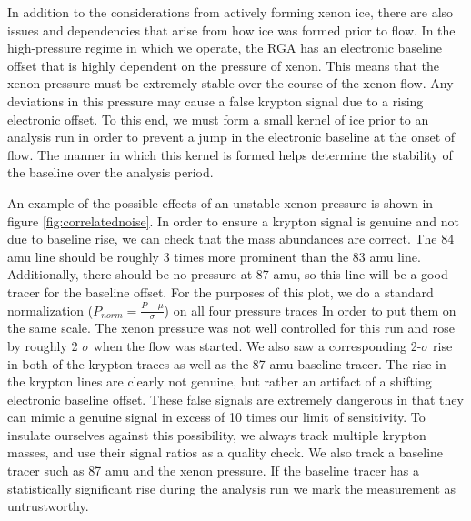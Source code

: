 In addition to the considerations from actively forming xenon ice, there are also issues and dependencies that arise from how ice was formed prior to flow. In the high-pressure regime in which we operate, the RGA has an electronic baseline offset that is highly dependent on the pressure of xenon. This means that the xenon pressure must be extremely stable over the course of the xenon flow. Any deviations in this pressure may cause a false krypton signal due to a rising electronic offset. To this end, we must form a small kernel of ice prior to an analysis run in order to prevent a jump in the electronic baseline at the onset of flow. The manner in which this kernel is formed helps determine the stability of the baseline over the analysis period.

An example of the possible effects of an unstable xenon pressure is shown in figure \ref{fig:correlatednoise}. In order to ensure a krypton signal is genuine and not due to baseline rise, we can check that the mass abundances are correct. The 84 amu line should be roughly 3 times more prominent than the 83 amu line. Additionally, there should be no pressure at 87 amu, so this line will be a good tracer for the baseline offset. For the purposes of this plot, we do a standard normalization ($P_{norm}=\frac{P-\mu}{\sigma}$) on all four pressure traces In order to put them on the same scale. The xenon pressure was not well controlled for this run and rose by roughly 2 $\sigma$ when the flow was started. We also saw a corresponding 2-$\sigma$ rise in both of the krypton traces as well as the 87 amu baseline-tracer. The rise in the krypton lines are clearly not genuine, but rather an artifact of a shifting electronic baseline offset. These false signals are extremely dangerous in that they can mimic a genuine signal in excess of 10 times our limit of sensitivity. To insulate ourselves against this possibility, we always track multiple krypton masses, and use their signal ratios as a quality check. We also track a baseline tracer such as 87 amu and the xenon pressure. If the baseline tracer has a statistically significant rise during the analysis run we mark the measurement as untrustworthy.

